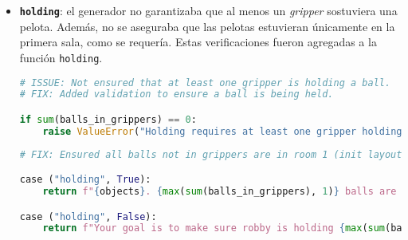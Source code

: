 \begin{anexes}
\begin{itemize}
\begin{lstlisting}[language=Python, caption={Corrección lógica en \texttt{GripperDatasetGenerator.drop\_and\_pickup}}, label={lst:gripper_drop_logic}, basicstyle=\ttfamily\small, frame=single]
if not any([b == 0 for b in balls_in_rooms[1:]]):
    raise ValueError("No empty room other than the starting one")
\end{lstlisting}

\begin{lstlisting}[language=Python, caption={Mejora de redacción en \texttt{GripperDatasetGenerator.abstract\_description} para \texttt{drop\_and\_pickup}}, label={lst:gripper_drop_text}, basicstyle=\ttfamily\small, frame=single]
# POTENTIAL ISSUE: Unclear phrasing regarding balls not held by robby.
# FIX: Clarified phrasing and ensured exception handling exists for layout constraints.

case ("drop_and_pickup", False):
    return "Your goal is to drop all the balls held by grippers in an empty room that the robby didn't start in, and pick up the balls that were not initially held by the robby."
\end{lstlisting}

    \item \textbf{\texttt{holding}}: el generador no garantizaba que al menos un \textit{gripper} sostuviera una pelota. Además, no se aseguraba que las pelotas estuvieran únicamente en la primera sala, como se requería. Estas verificaciones fueron agregadas a la función \texttt{holding}.

\begin{lstlisting}[language=Python, caption={Control de errores en \texttt{GripperDatasetGenerator.holding}}, label={lst:gripper_holding_logic}, basicstyle=\ttfamily\small, frame=single]
# ISSUE: Not ensured that at least one gripper is holding a ball.
# FIX: Added validation to ensure a ball is being held.

if sum(balls_in_grippers) == 0:
    raise ValueError("Holding requires at least one gripper holding a ball")
\end{lstlisting}

\begin{lstlisting}[language=Python, caption={Corrección en descripción abstracta para \texttt{holding}}, label={lst:gripper_holding_text}, basicstyle=\ttfamily\small, frame=single]
# FIX: Ensured all balls not in grippers are in room 1 (init layout constraint assumed).

case ("holding", True):
    return f"{objects}. {max(sum(balls_in_grippers), 1)} balls are distributed across the same number of grippers, and the rest are in the first room. The robby is in the first room."

case ("holding", False):
    return f"Your goal is to make sure robby is holding {max(sum(balls_in_grippers), 1)} balls."
\end{lstlisting}


\end{itemize}
\end{anexes}
